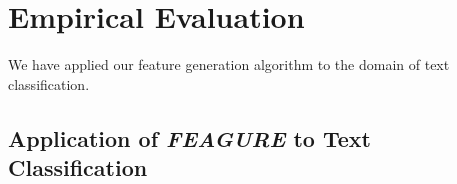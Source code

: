 \documentclass[twoside,11pt]{article}
\theoremstyle{definition}
\begin{document}
\section{Empirical Evaluation}
We have applied our feature generation algorithm to the domain of text classification. %

\subsection{Application of \emph{FEAGURE} to Text Classification} \label{text-feagure}


\end{document}

